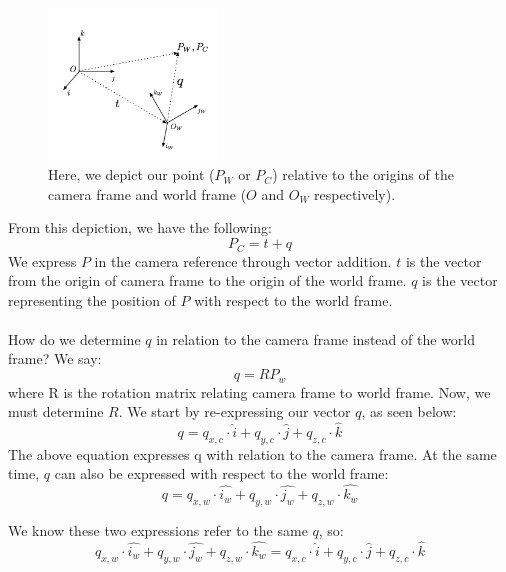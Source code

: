 \documentclass[]{article}
\begin{document}
\begin{figure}[H]
\includegraphics[width=0.4\textwidth]{vik_image_3.png}
\centering
\caption{Here, we depict our point ($P_W$ or $P_C$) relative to the origins of the camera frame and world frame ($O$ and $O_W$ respectively). }
\label{fig:camera_coordinates}
\end{figure}

From this depiction, we have the following:
\begin{equation}
\label{eq:ising}
P_{C} = t + q
\end{equation}
We express $P$ in the camera reference through vector addition. $t$ is the vector from the origin of camera frame to the origin of the world frame. $q$ is the vector representing the position of $P$ with respect to the world frame.\\\\
How do we determine $q$ in relation to the camera frame instead of the world frame? We say:
\begin{equation}
\label{eq:ising}
q = RP_{w}
\end{equation}
where R is the rotation matrix relating camera frame to world frame. Now, we must determine $R$. We start by re-expressing our vector $q$, as seen below:
\begin{equation}
\label{eq:1}
q = q_{x,c} \cdot \hat{i} + q_{y,c} \cdot \hat{j} + q_{z,c} \cdot \hat{k}
\end{equation}
The above equation expresses q with relation to the camera frame.
At the same time, $q$ can also be expressed with respect to the world frame:
\begin{equation}
\label{eq:ising}
q = q_{x,w} \cdot \hat{i_{w}} + q_{y,w} \cdot \hat{j_{w}} + q_{z,w} \cdot \hat{k_{w}}
\end{equation}

We know these two expressions refer to the same $q$, so:
\begin{equation}
\label{eq:ising}
q_{x,w} \cdot \hat{i_{w}} + q_{y,w} \cdot \hat{j_{w}} + q_{z,w} \cdot \hat{k_{w}} = q_{x,c} \cdot \hat{i} + q_{y,c} \cdot \hat{j} + q_{z,c} \cdot \hat{k}
\end{equation}
\end{document}

